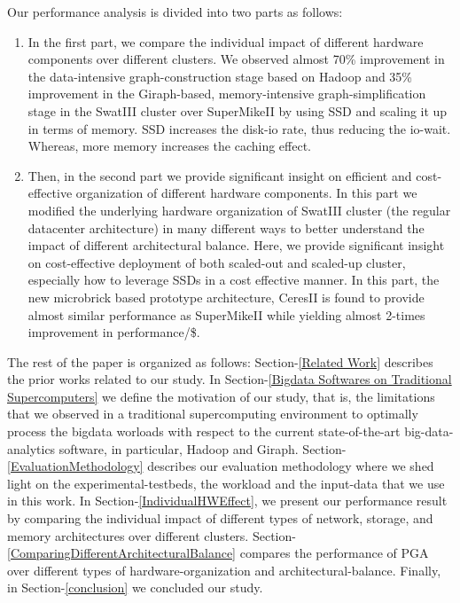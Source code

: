 \documentclass[conference]{IEEEtran}
\begin{document}
Our performance analysis is divided into two parts as follows:
\begin{enumerate}
\item In the first part, we compare the individual impact of different hardware components over different clusters. We observed almost 70\% improvement in the data-intensive graph-construction stage based on Hadoop and 35\% improvement in the Giraph-based, memory-intensive graph-simplification stage in the SwatIII cluster over SuperMikeII by using SSD and scaling it up in terms of memory. SSD increases the disk-io rate, thus reducing the io-wait. Whereas, more memory increases the caching effect.
\item Then, in the second part we provide significant insight on efficient and cost-effective organization of different hardware components. In this part we modified the underlying hardware organization of SwatIII cluster (the regular datacenter architecture) in many different ways to better understand the impact of different architectural balance. Here, we provide significant insight on cost-effective deployment of both scaled-out and scaled-up cluster, especially how to leverage SSDs in a cost effective manner. 
In this part, the new microbrick based prototype architecture, CeresII is found to provide almost similar performance as SuperMikeII while yielding almost 2-times improvement in performance/\$. 
\end{enumerate}

The rest of the paper is organized as follows:
Section-\ref{Related Work} describes the prior works related to our study.
In Section-\ref{Bigdata Softwares on Traditional Supercomputers} we define the motivation of our study, that is, the limitations that we observed in a traditional supercomputing environment to optimally process the bigdata worloads with respect to the current state-of-the-art big-data-analytics software, in particular, Hadoop and Giraph.
Section-\ref{EvaluationMethodology} describes our evaluation methodology where we shed light on the experimental-testbeds, the workload and the input-data that we use in this work.
In Section-\ref{IndividualHWEffect}, we present our performance result by comparing the individual impact of different types of network, storage, and memory architectures over different clusters.
Section-\ref{ComparingDifferentArchitecturalBalance} compares the performance of PGA over different types of hardware-organization and architectural-balance. Finally, in Section-\ref{conclusion} we concluded our study.
\end{document}
